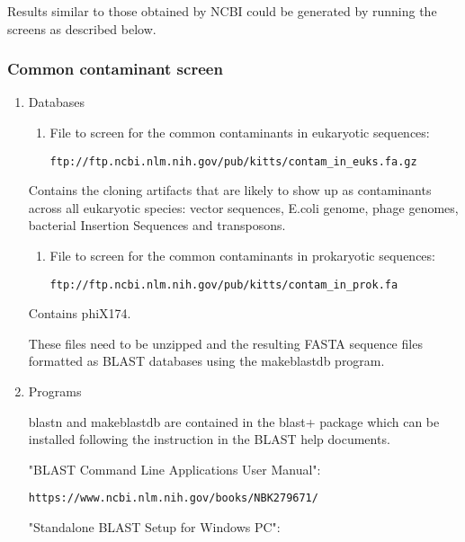 \documentclass[11pt]{article}
\begin{document}
Results similar to those obtained by NCBI could be generated by running
the screens as described below.

\subsubsection{Common contaminant screen}
\label{sec:org6ec9968}
\begin{enumerate}
\item Databases
\label{sec:org57b4631}


\begin{enumerate}
\item File to screen for the common contaminants in eukaryotic sequences:

\begin{verbatim}
ftp://ftp.ncbi.nlm.nih.gov/pub/kitts/contam_in_euks.fa.gz
\end{verbatim}
\end{enumerate}

Contains the cloning artifacts that are likely to show up as
contaminants across all eukaryotic species: vector sequences, E.coli
genome, phage genomes, bacterial Insertion Sequences and transposons.

\begin{enumerate}
\item File to screen for the common contaminants in prokaryotic sequences:

\begin{verbatim}
ftp://ftp.ncbi.nlm.nih.gov/pub/kitts/contam_in_prok.fa
\end{verbatim}
\end{enumerate}

Contains phiX174.

These files need to be unzipped and the resulting FASTA sequence files
formatted as BLAST databases using the makeblastdb program.

\item Programs
\label{sec:org0800ae1}


blastn and makeblastdb are contained in the blast+ package which can be
installed following the instruction in the BLAST help documents.

"BLAST Command Line Applications User Manual":

\begin{verbatim}
https://www.ncbi.nlm.nih.gov/books/NBK279671/
\end{verbatim}

"Standalone BLAST Setup for Windows PC":


\end{enumerate}
\end{document}
